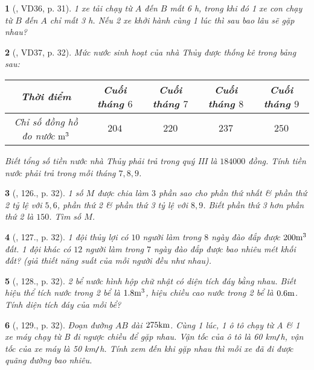 \documentclass{article}
\newtheorem{baitoan}{}
\begin{document}
\begin{baitoan}[\cite{Tuyen_Toan_7}, VD36, p. 31]
	1 xe tải chạy từ $A$ đến $B$ mất {\rm6 h}, trong khi đó 1 xe con chạy từ $B$ đến $A$ chỉ mất {\rm3 h}. Nếu 2 xe khởi hành cùng 1 lúc thì sau bao lâu sẽ gặp nhau?
\end{baitoan}

\begin{baitoan}[\cite{Tuyen_Toan_7}, VD37, p. 32]
	Mức nước sinh hoạt của nhà Thủy được thống kê trong bảng sau:	
	\begin{table}[H]
		\centering
		\begin{tabular}{|c|c|c|c|c|}
			\hline
			Thời điểm & Cuối tháng $6$ & Cuối tháng $7$ & Cuối tháng $8$ & Cuối tháng $9$ \\
			\hline
			Chỉ số đồng hồ đo nước $\rm m^3$ & $204$ & $220$ & $237$ & $250$ \\
			\hline
		\end{tabular}
	\end{table}
	\noindent Biết tổng số tiền nước nhà Thủy phải trả trong quý III là $184000$ đồng. Tính tiền nước phải trả trong mỗi tháng $7,8,9$.
\end{baitoan}

\begin{baitoan}[\cite{Tuyen_Toan_7}, 126., p. 32]
	1 số $M$ được chia làm $3$ phần sao cho phần thứ nhất \& phần thứ 2 tỷ lệ với $5,6$, phần thứ 2 \& phần thứ 3 tỷ lệ với $8,9$. Biết phần thứ 3 hơn phần thứ 2 là $150$. Tìm số $M$.
\end{baitoan}

\begin{baitoan}[\cite{Tuyen_Toan_7}, 127., p. 32]
	1 đội thủy lợi có $10$ người làm trong $8$ ngày đào đắp được $\rm200m^3$ đất. 1 đội khác có $12$ người làm trong $7$ ngày đào đắp được bao nhiêu mét khối đất? (giả thiết năng suất của mỗi người đều như nhau).
\end{baitoan}

\begin{baitoan}[\cite{Tuyen_Toan_7}, 128., p. 32]
	2 bể nước hình hộp chữ nhật có diện tích đáy bằng nhau. Biết hiệu thể tích nước trong 2 bể là $\rm1.8m^3$, hiệu chiều cao nước trong 2 bể là $\rm0.6m$. Tính diện tích đáy của mỗi bể?
\end{baitoan}

\begin{baitoan}[\cite{Tuyen_Toan_7}, 129., p. 32]
	Đoạn đường $AB$ dài $\rm275km$. Cùng 1 lúc, 1 ô tô chạy từ A \& 1 xe máy chạy từ B đi ngược chiều để gặp nhau. Vận tốc của ô tô là {\rm60 km{\tt/}h}, vận tốc của xe máy là {\rm50 km{\tt/}h}. Tính xem đến khi gặp nhau thì mỗi xe đã đi được quãng đường bao nhiêu.
\end{baitoan}
\end{document}
